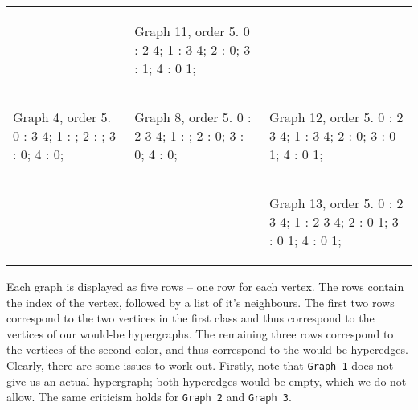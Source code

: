 \begin{tabular}{|p{1.5in} | p{1.5in} | p{1.5in} |}
\begin{minipage}{1.5in}
\begin{datalisting}
\end{datalisting}
\end{minipage}
&
\begin{minipage}{1.5in}
\begin{datalisting}
Graph 11, order 5.
0 : 2 4;
1 : 3 4;
2 : 0;
3 : 1;
4 : 0 1;

\end{datalisting}
\end{minipage}
\\
\begin{minipage}{1.5in}
\begin{datalisting}
Graph 4, order 5.
0 : 3 4;
1 : ;
2 : ;
3 : 0;
4 : 0;

\end{datalisting}
\end{minipage}
&
\begin{minipage}{1.5in}
\begin{datalisting}
Graph 8, order 5.
0 : 2 3 4;
1 : ;
2 : 0;
3 : 0;
4 : 0;

\end{datalisting}
\end{minipage}
&
\begin{minipage}{1.5in}
\begin{datalisting}
Graph 12, order 5.
0 : 2 3 4;
1 : 3 4;
2 : 0;
3 : 0 1;
4 : 0 1;

\end{datalisting}
\end{minipage}
\\
&
&
\begin{minipage}{1.5in}
\begin{datalisting}
Graph 13, order 5.
0 : 2 3 4;
1 : 2 3 4;
2 : 0 1;
3 : 0 1;
4 : 0 1;

\end{datalisting}
\end{minipage}
\\
\end{tabular}


Each graph is displayed as five rows -- one row for each vertex.
The rows contain the index of the vertex, followed by a list of it's neighbours.
The first two rows correspond to the two vertices in the first class and thus correspond to the vertices of our would-be hypergraphs.
The remaining three rows correspond to the vertices of the second color, and thus correspond to the would-be hyperedges.
Clearly, there are some issues to work out. Firstly, note that \texttt{Graph 1} does not give us an actual hypergraph; both hyperedges would be empty, which we do not allow. The same criticism holds for \texttt{Graph 2} and \texttt{Graph 3}.

